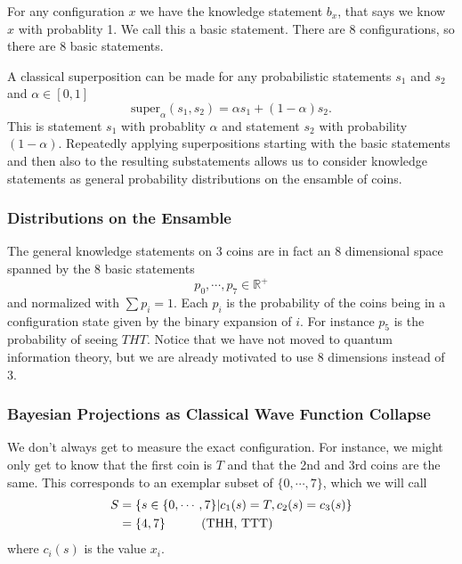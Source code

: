 \documentclass[12pt,a4paper]{article}
\begin{document}
For any configuration $x$ we have the knowledge statement $b_x$, that says we know $x$ with probablity 1.  We call this a basic statement.  There are 8 configurations, so there are 8 basic statements.

A classical superposition can be made for any probabilistic statements $s_1$ and $s_2$ and $\alpha \in [0,1]$
\[
\text{super}_\alpha(s_1,s_2) = \alpha s_1 + (1 -\alpha) s_2.
\]
This is statement $s_1$ with probablity $\alpha$ and statement $s_2$ with probability $(1-\alpha)$.  Repeatedly applying superpositions starting with the basic statements and then also to the resulting substatements allows us to consider knowledge statements as general probability distributions on the ensamble of coins.

\subsubsection{Distributions on the Ensamble}
The general knowledge statements on 3 coins are in fact an 8 dimensional space spanned by the 8 basic statements
\[
   p_0,\cdots,p_{7} \in \mathbb{R}^+
\]
and normalized with $\sum p_i = 1$.  Each $p_i$ is the probability of the coins being in a configuration state given by the binary expansion of $i$.  For instance $p_5$ is the probability of seeing $THT$. Notice that we have not moved to quantum information theory, but we are already motivated to use 8 dimensions instead of 3.

\subsubsection{Bayesian Projections as Classical Wave Function Collapse}
\label{proj}
We don't always get to measure the exact configuration.  For instance, we might only get to know that the first coin is $T$ and that the 2nd and 3rd coins are the same.  This corresponds to an exemplar subset of $\{0,\cdots,7\}$, which we will call
\[
\begin{split}
  S &= \{s \in \{0,\cdots,7\} | c_1(s) = T, c_2(s) = c_3(s) \} \\
    & = \{4,7\} \hspace{0.4 in} \text{(THH, TTT)}
\end{split}
\]
where $c_i(s)$ is the value $x_i$.
\end{document}
